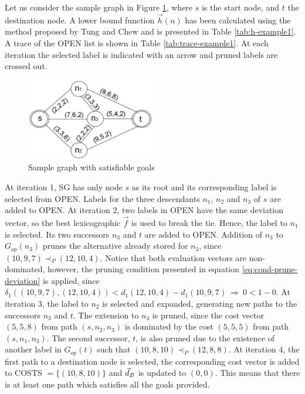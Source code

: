 Let us consider the sample graph in Figure \ref{fig:2-3}, where $s$ is the start node, and $t$ the destination node. A lower bound function $\vec{h}(n)$ has been calculated using the method proposed by Tung and Chew \citep{Tung1992} and is presented in Table \ref{tab:h-example1}. A trace of the OPEN list is shown in Table \ref{tab:trace-example1}. At each iteration the selected label is indicated with an arrow and pruned labels are crossed out.

\begin{figure}[!ht]
\centering
\includegraphics[width=0.5\textwidth]{Images/Chapter4/graph1}
\caption{Sample graph with satisfiable goals}
\label{fig:2-3}
\end{figure}

At iteration 1, SG has only node $s$ as its root and its corresponding label is selected from OPEN. Labels for the three descendants $n_1$, $n_2$ and $n_3$ of $s$ are added to OPEN. At iteration 2, two labels in OPEN have the same deviation vector, so the best lexicographic $\vec{f}$ is used to break the tie. Hence, the label to $n_1$ is selected. Its two successors $n_3$ and $t$ are added to OPEN. Addition of $n_3$ to $G_{op}(n_3)$ prunes the alternative already stored for $n_3$, since $(10,9,7) \prec_{P} (12,10,4)$. Notice that both evaluation vectors are non-dominated, however, the pruning condition presented in equation \ref{eq:cond-prune-deviation} is applied, since  $\delta_1((10,9,7),(12,10,4)) < d_1(12,10,4) - d_1(10,9,7) \ \Rightarrow \ 0 < 1-0$. At iteration 3, the label to $n_2$ is selected and expanded, generating new paths to the successors $n_3$ and $t$. The extension to $n_3$ is pruned, since the cost vector $(5,5,8)$ from path $(s, n_2, n_3)$ is dominated by the cost $(5,5,5)$ from path $(s, n_1, n_3)$. The second successor, $t$, is also pruned due to the existence of another label in $G_{op}(t)$ such that $(10,8,10) \prec_{P} (12,8,8)$. At iteration 4, the first path to a destination node is selected, the corresponding cost vector is added to COSTS $= \{ (10,8,10) \}$ and $\vec{d}_B$ is updated to $(0,0)$. This means that there is at least one path which satisfies all the goals provided. 

